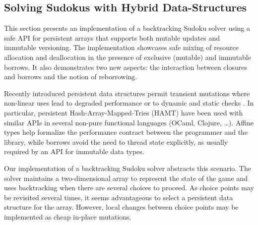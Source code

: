 \subsection{Solving Sudokus with Hybrid Data-Structures}

This section presents an implementation of a
backtracking Sudoku solver using a safe API for persistent arrays that
supports both mutable updates and immutable versioning.
The implementation showcases safe mixing of resource allocation and
deallocation in the presence of exclusive (mutable) and immutable
borrows. It also demonstrates two new aspects: the interaction between
closures and borrows and the notion of reborrowing.

Recently introduced persistent data structures
permit transient mutations where
non-linear uses lead to degraded performance
\cite{DBLP:conf/ml/ConchonF07} or to
dynamic and static checks \cite{DBLP:journals/pacmpl/Puente17}.
In particular, persistent Hash-Array-Mapped-Tries (HAMT) have been used with similar
APIs in several non-pure functional languages (OCaml, Clojure, \dots).
Affine types help formalize the performance contract between the programmer
and the library, while borrows avoid the need to thread state explicitly,
as usually required by an API for immutable data types.
%

Our implementation of a backtracking Sudoku solver abstracts this scenario.
The solver maintains a two-dimensional array to represent the state of
the game and uses backtracking when there are several choices to proceed.
As choice points may be revisited several times, it seems advantageous
to select a persistent data structure for the array.
However, local changes between choice points may be implemented as
cheap in-place mutations.

